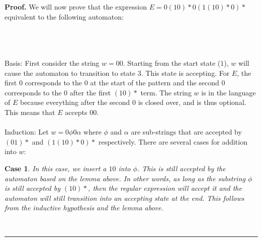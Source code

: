 \documentclass{article}%
\newtheorem{case}[theorem]{Case}
\newenvironment{proof}[1][Proof]{\noindent\textbf{#1.} }{\ \rule{0.5em}{0.5em}}
\begin{document}
\begin{proof}
    We will now prove that the expression $E=0(10)*0 ( 1(10)*0 )*$ equivalent to the following automaton:\\
    \\
    \begin{center}
    \end{center}\\
    \\
    Basis: First consider the string $w=00$. Starting from the start state ($1$), $w$ will cause the automaton to transition to
    state $3$. This state is accepting. For $E$, the first $0$ corresponds to the $0$ at the start of the pattern and the second
    $0$ corresponds to the $0$ after the first $(10)*$ term. The string $w$ is in the language of $E$ because everything after the
    second $0$ is closed over, and is thus optional. This means that $E$ accepts $00$.\\
    \\
    Induction: Let $w=0\phi0\alpha$ where $\phi$ and $\alpha$ are sub-strings that are accepted by $(01)*$ and $(1(10)*0)*$
    respectively. There are several cases for addition into $w$:

    \begin{case}
        In this case, we insert a $10$ into $\phi$. This is still accepted by the automaton based on the lemma above. In other words,
        as long as the substring $\phi$ is still accepted by $(10)*$, then the regular expression will accept it and the automaton will
        still transition into an accepting state at the end. This follows from the inductive hypothesis and the lemma above.
    \end{case}


\end{proof}
\end{document}
